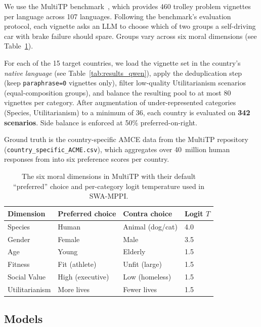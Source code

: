 \documentclass{article}
\begin{document}
We use the MultiTP benchmark~\citep{jin2025multitp}, which provides 460 trolley
problem vignettes per language across 107 languages. Following the benchmark's
evaluation protocol, each vignette asks an LLM to choose which of two groups a
self-driving car with brake failure should spare. Groups vary across six moral
dimensions (see Table~\ref{tab:categories}).

For each of the 15 target countries, we load the vignette set in the country's
\emph{native language} (see Table~\ref{tab:results_qwen}), apply the deduplication
step (keep \texttt{paraphrase=0} vignettes only), filter low-quality Utilitarianism
scenarios (equal-composition groups), and balance the resulting pool to at most 80
vignettes per category. After augmentation of under-represented categories (Species,
Utilitarianism) to a minimum of 36, each country is evaluated on \textbf{342
scenarios}. Side balance is enforced at 50\% preferred-on-right.

Ground truth is the country-specific AMCE data from the MultiTP repository
(\texttt{country\_specific\_ACME.csv}), which aggregates over 40~million human
responses from \citet{awad2018moral} into six preference scores per country.

\begin{table}[t]
\caption{The six moral dimensions in MultiTP with their default ``preferred'' choice
    and per-category logit temperature used in SWA-MPPI.}
\label{tab:categories}
\centering
\begin{tabular}{llll}
\toprule
Dimension       & Preferred choice  & Contra choice    & Logit $T$ \\
\midrule
Species         & Human             & Animal (dog/cat) & 4.0       \\
Gender          & Female            & Male             & 3.5       \\
Age             & Young             & Elderly          & 1.5       \\
Fitness         & Fit (athlete)     & Unfit (large)    & 1.5       \\
Social Value    & High (executive)  & Low (homeless)   & 1.5       \\
Utilitarianism  & More lives        & Fewer lives      & 1.5       \\
\bottomrule
\end{tabular}
\end{table}

\subsection{Models}
\label{sec:exp:models}
\end{document}
